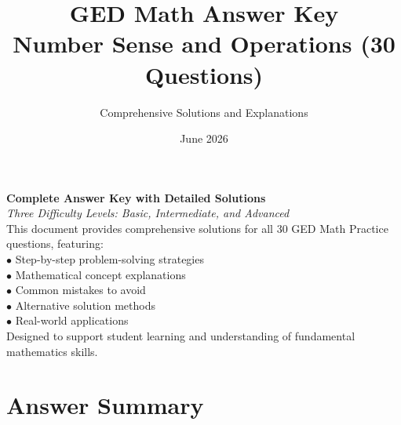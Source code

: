 \documentclass[12pt]{article}
\title{\Huge GED Math Answer Key \\ \Large Number Sense and Operations (30 Questions)}
\author{Comprehensive Solutions and Explanations}
\date{June 2026}
\begin{document}
\maketitle
\thispagestyle{empty}
\vspace{2cm}

\begin{center}
\Large \textbf{Complete Answer Key with Detailed Solutions} \\[0.5cm]
\textit{Three Difficulty Levels: Basic, Intermediate, and Advanced} \\[2cm]
\normalsize
This document provides comprehensive solutions for all 30 GED Math Practice questions, featuring:\\
$\bullet$ Step-by-step problem-solving strategies \\
$\bullet$ Mathematical concept explanations \\
$\bullet$ Common mistakes to avoid \\
$\bullet$ Alternative solution methods \\
$\bullet$ Real-world applications \\[2cm]
Designed to support student learning and understanding of fundamental mathematics skills.
\end{center}

\newpage

\section*{Answer Summary}
\end{document}
